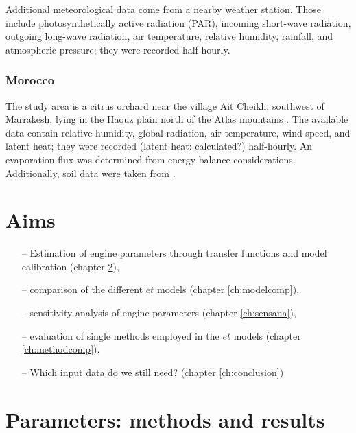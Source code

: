 \documentclass{scrreprt}
\begin{document}
Additional meteorological data come from a nearby weather station.
Those include photosynthetically active radiation (PAR), incoming short-wave radiation, outgoing long-wave radiation, air temperature, relative humidity, rainfall, and atmospheric pressure; they were recorded half-hourly.

\subsection{Morocco} \label{ssec:intro_areas_morocco}

The study area is a citrus orchard near the village Ait Cheikh, southwest of Marrakesh, lying in the Haouz plain north of the Atlas mountains \citep{mroos14}.
The available data contain relative humidity, global radiation, air temperature, wind speed, and latent heat; they were recorded (latent heat: calculated?) half-hourly.
An evaporation flux was determined from energy balance considerations.
Additionally, soil data were taken from \citet{mroos14}.


\chapter{Aims} \label{ch:aims}

\begin{itemize}
  \item[--] Estimation of engine parameters through transfer functions and model calibration (chapter \ref{ch:parest}),
  \item[--] comparison of the different $et$ models (chapter \ref{ch:modelcomp}),
  \item[--] sensitivity analysis of engine parameters (chapter \ref{ch:sensana}),
  \item[--] evaluation of single methods employed in the $et$ models (chapter \ref{ch:methodcomp}).
  \item[--] Which input data do we still need? (chapter \ref{ch:conclusion})
\end{itemize}


\chapter{Parameters: methods and results} \label{ch:parest}
\end{document}
